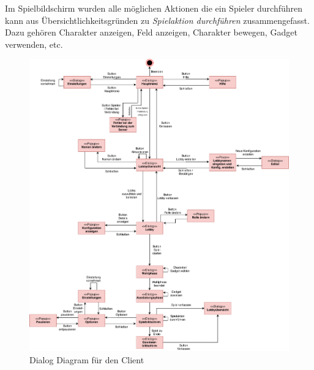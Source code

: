 Im Spielbildschirm wurden alle möglichen Aktionen die ein Spieler durchführen kann aus Übersichtlichkeitsgründen zu \textit{Spielaktion durchführen} zusammengefasst. Dazu gehören Charakter anzeigen, Feld anzeigen, Charakter bewegen, Gadget verwenden, etc.
\begin{figure}
  \centering
  \includegraphics[width=\textwidth]{Meilenstein03/client_dialog.pdf}
  \caption{Dialog Diagram für den Client}
\end{figure}
